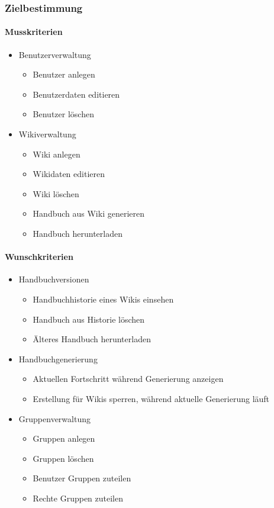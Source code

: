 \label{app:lastenehft}

\subsubsection*{Zielbestimmung}

	\paragraph*{Musskriterien}
		\begin{itemize}
			\item Benutzerverwaltung
			\begin{itemize}
				\item Benutzer anlegen
				\item Benutzerdaten editieren
				\item Benutzer löschen
			\end{itemize}
			\item Wikiverwaltung
			\begin{itemize}
				\item Wiki anlegen
				\item Wikidaten editieren
				\item Wiki löschen
				\item Handbuch aus Wiki generieren
				\item Handbuch herunterladen
			\end{itemize}
		\end{itemize}

	\paragraph*{Wunschkriterien}
		\begin{itemize}
			\item Handbuchversionen
			\begin{itemize}
				\item Handbuchhistorie eines Wikis einsehen
				\item Handbuch aus Historie löschen
				\item Älteres Handbuch herunterladen
			\end{itemize}
			\item Handbuchgenerierung
			\begin{itemize}
				\item Aktuellen Fortschritt während Generierung anzeigen
				\item Erstellung für Wikis sperren, während aktuelle Generierung läuft
			\end{itemize}
			\item Gruppenverwaltung
			\begin{itemize}
				\item Gruppen anlegen
				\item Gruppen löschen
				\item Benutzer Gruppen zuteilen
				\item Rechte Gruppen zuteilen
			\end{itemize}
		\end{itemize}

